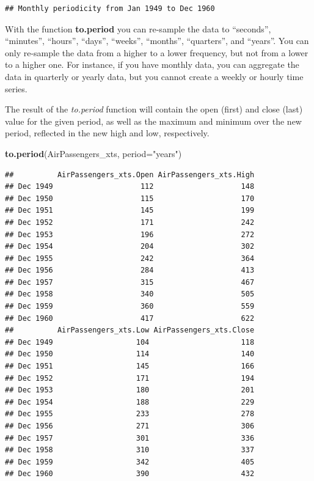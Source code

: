 \documentclass[
]{article}
\newenvironment{Shaded}{\begin{snugshade}}{\end{snugshade}}
\newcommand{\DataTypeTok}[1]{\textcolor[rgb]{0.13,0.29,0.53}{#1}}
\newcommand{\KeywordTok}[1]{\textcolor[rgb]{0.13,0.29,0.53}{\textbf{#1}}}
\newcommand{\NormalTok}[1]{#1}
\newcommand{\StringTok}[1]{\textcolor[rgb]{0.31,0.60,0.02}{#1}}
\begin{document}
\begin{verbatim}
## Monthly periodicity from Jan 1949 to Dec 1960
\end{verbatim}

With the function \textbf{to.period} you can re-sample the data to ``seconds'', ``minutes'', ``hours'', ``days'', ``weeks'', ``months'', ``quarters'', and ``years''. You can only re-sample the data from a higher to a lower frequency, but not from a lower to a higher one. For instance, if you have monthly data, you can aggregate the data in quarterly or yearly data, but you cannot create a weekly or hourly time series.

The result of the \emph{to.period} function will contain the open (first) and close (last) value for the given period, as well as the maximum and minimum over the new period, reflected in the new high and low, respectively.

\begin{Shaded}
\begin{Highlighting}[]
\KeywordTok{to.period}\NormalTok{(AirPassengers_xts, }\DataTypeTok{period=}\StringTok{"years"}\NormalTok{)}
\end{Highlighting}
\end{Shaded}

\begin{verbatim}
##          AirPassengers_xts.Open AirPassengers_xts.High
## Dec 1949                    112                    148
## Dec 1950                    115                    170
## Dec 1951                    145                    199
## Dec 1952                    171                    242
## Dec 1953                    196                    272
## Dec 1954                    204                    302
## Dec 1955                    242                    364
## Dec 1956                    284                    413
## Dec 1957                    315                    467
## Dec 1958                    340                    505
## Dec 1959                    360                    559
## Dec 1960                    417                    622
##          AirPassengers_xts.Low AirPassengers_xts.Close
## Dec 1949                   104                     118
## Dec 1950                   114                     140
## Dec 1951                   145                     166
## Dec 1952                   171                     194
## Dec 1953                   180                     201
## Dec 1954                   188                     229
## Dec 1955                   233                     278
## Dec 1956                   271                     306
## Dec 1957                   301                     336
## Dec 1958                   310                     337
## Dec 1959                   342                     405
## Dec 1960                   390                     432
\end{verbatim}
\end{document}
